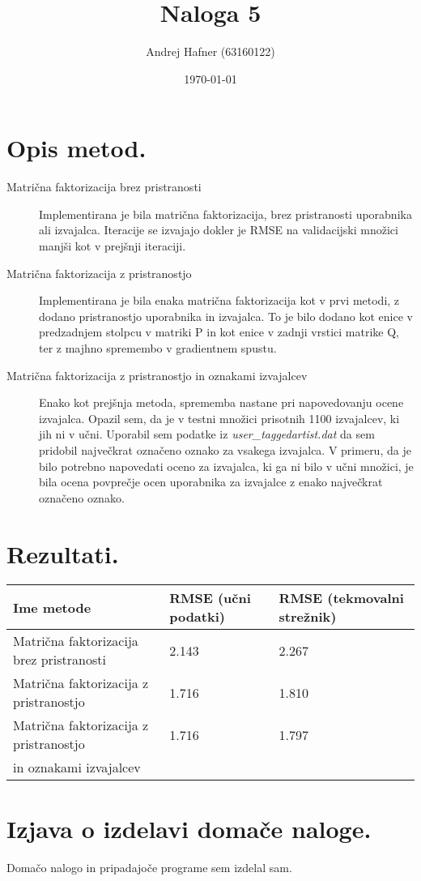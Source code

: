 \documentclass[a4paper,11pt]{article}
\title{Naloga 5}
\author{Andrej Hafner (63160122)}
\date{\today}
\begin{document}
\maketitle


\normalfont\textsl{}
\section{Opis metod.}

\begin{description}
\item[Matrična faktorizacija brez pristranosti] Implementirana je bila matrična faktorizacija, brez pristranosti uporabnika ali izvajalca. Iteracije se izvajajo dokler je RMSE na validacijski množici manjši kot v prejšnji iteraciji. 

\item[Matrična faktorizacija z pristranostjo] Implementirana je bila enaka matrična faktorizacija kot v prvi metodi, z dodano pristranostjo uporabnika in izvajalca. To je bilo dodano kot enice v predzadnjem stolpcu v matriki P in kot enice v zadnji vrstici matrike Q, ter z majhno spremembo v gradientnem spustu. 
\item[Matrična faktorizacija z pristranostjo in oznakami izvajalcev] Enako kot prejšnja metoda, sprememba nastane pri napovedovanju ocene izvajalca. Opazil sem, da je v testni množici prisotnih 1100 izvajalcev, ki jih ni v učni. Uporabil sem podatke iz \textit{user\_taggedartist.dat} da sem pridobil največkrat označeno oznako za vsakega izvajalca. V primeru, da je bilo potrebno napovedati oceno za izvajalca, ki ga ni bilo v učni množici, je bila ocena povprečje ocen uporabnika za izvajalce z enako največkrat označeno oznako.
\end{description}

\section{Rezultati.} 

\begin{table}[!htb]
	\centering
		\begin{tabular}{llp{4.3cm}}
			\hline
			 Ime metode & RMSE (učni podatki) & RMSE (tekmovalni strežnik) \\
			\hline
			Matrična faktorizacija brez pristranosti & 2.143  & 2.267 \\
			Matrična faktorizacija z pristranostjo & 1.716  & 1.810 \\
			Matrična faktorizacija z pristranostjo  & 1.716  & 1.797 \\
			in oznakami izvajalcev & & \\
			\hline
		\end{tabular}
\end{table}





\section{Izjava o izdelavi domače naloge.}
Domačo nalogo in pripadajoče programe sem izdelal sam.
\end{document}
